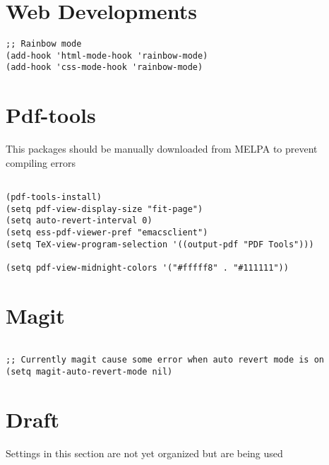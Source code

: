 \documentclass[11pt]{article}
\begin{document}
\section{Web Developments}
\label{sec:orgf97159f}
\begin{verbatim}
;; Rainbow mode
(add-hook 'html-mode-hook 'rainbow-mode)
(add-hook 'css-mode-hook 'rainbow-mode)
\end{verbatim}

\section{Pdf-tools}
\label{sec:org310c788}
This packages should be manually downloaded from MELPA to prevent compiling errors

\begin{verbatim}

(pdf-tools-install)
(setq pdf-view-display-size "fit-page")
(setq auto-revert-interval 0)
(setq ess-pdf-viewer-pref "emacsclient")
(setq TeX-view-program-selection '((output-pdf "PDF Tools")))

(setq pdf-view-midnight-colors '("#fffff8" . "#111111"))
\end{verbatim}

\section{Magit}
\label{sec:orgb20ca7b}

\begin{verbatim}

;; Currently magit cause some error when auto revert mode is on
(setq magit-auto-revert-mode nil)

\end{verbatim}

\section{Draft}
\label{sec:org4a654b2}
Settings in this section are not yet organized but are being used
\end{document}
